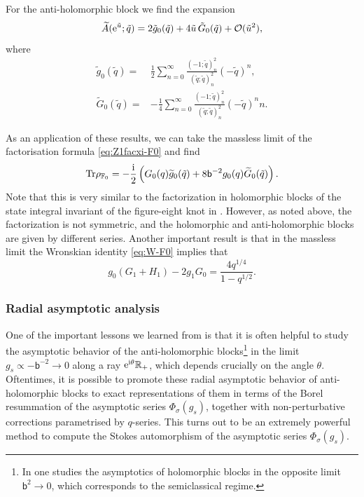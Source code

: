 \documentclass[a4paper,11pt]{article}
\theoremstyle{definition}
\newcommand{\CO}{{\cal O}}
\def\IR{{\mathbb R}}
\def\IF{{\mathbb F}}
\newcommand{\tr}{{\rm Tr}}
\newcommand{\re}{{\rm e}}
\newcommand{\ri}{{\rm i}}
\def\tq{{\tilde{q}}}
\newcommand{\bb}{\mathsf{b}}
\newcommand{\wt}[1]{\widetilde{#1}}
\begin{document}
For the anti-holomorphic block we find the expansion 
\begin{equation}
  \wt{A}(\re^{\tilde{u}};\tq) = 2\tilde{g}_0(\tq) + 4\tilde{u}\,
  \tilde{G}_0(\tq) + \CO(\tilde{u}^2),
\end{equation}
where
\begin{subequations}
  \begin{align}
    \tilde{g}_0(\tq) =
    &\frac{1}{2}
      \sum_{n=0}^\infty\frac{(-1;\tq)_n^2}{(\tq;\tq)_n^2}(-\tq)^n,\\
    \tilde{G}_0(\tq) =
    &-\frac{1}{4}\sum_{n=0}^\infty\frac{(-1;\tq)_n^2}{(\tq;\tq)_n^2}(-\tq)^nn.
  \end{align}
\end{subequations}

As an application of these results, we can take the massless limit of
the factorisation formula \eqref{eq:Z1facxi-F0} and find
\begin{equation}
  \tr\rho_{\IF_0} = -\frac{\ri}{2}
  \left(G_0(q) \wt{g}_0(\tq) +8\bb^{-2} g_0(q) \wt{G}_0(\tq) \right).
  \label{eq:Z1fac0-F0}
\end{equation}
%
Note that this is very similar to the factorization in holomorphic blocks of the state integral invariant 
of the figure-eight knot in \cite{GK-qseries}. However, as noted above, the factorization is not 
symmetric, and the holomorphic and anti-holomorphic blocks are given by different series. 
Another important result is that in the massless limit the Wronskian
identity \eqref{eq:W-F0} implies that
\begin{equation}
  g_0(G_1+H_1) - 2g_1 G_0 = \frac{4q^{1/4}}{1-q^{1/2}}.
  \label{eq:W-id}
\end{equation}

\subsubsection{Radial asymptotic analysis}

One of the important lessons we learned from \cite{ggm1,ggm2} is that
it is often helpful to study the asymptotic behavior of the
anti-holomorphic blocks\footnote{In \cite{ggm1,ggm2} one studies the asymptotics of
  holomorphic blocks in the opposite limit $\bb^2\rightarrow 0$, which corresponds to the semiclassical regime.} in the limit
$g_s \propto -\bb^{-2} \rightarrow 0$ along a ray
$\re^{\ri\theta}\IR_+$, which depends crucially on the angle $\theta$.
Oftentimes, it is possible to promote these radial asymptotic behavior
of anti-holomorphic blocks to exact representations of them in terms
of the Borel resummation of the asymptotic series $\Phi_\sigma(g_s)$,
together with non-perturbative corrections parametrised by $q$-series.
This turns out to be an extremely powerful method to compute the
Stokes automorphism of the asymptotic series $\Phi_\sigma(g_s)$.
\end{document}
